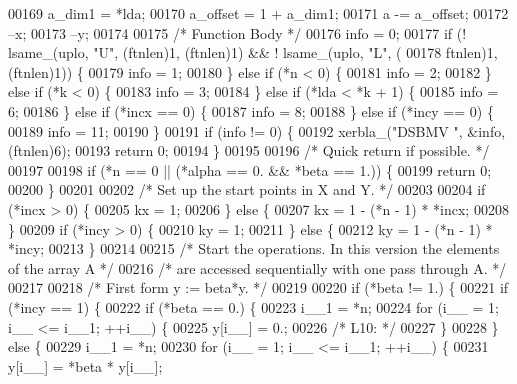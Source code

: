 \begin{DoxyCode}
00169     a\_dim1 = *lda;
00170     a\_offset = 1 + a\_dim1;
00171     a -= a\_offset;
00172     --x;
00173     --y;
00174 
00175     \textcolor{comment}{/* Function Body */}
00176     info = 0;
00177     \textcolor{keywordflow}{if} (! lsame\_(uplo, \textcolor{stringliteral}{"U"}, (ftnlen)1, (ftnlen)1) && ! lsame\_(uplo, \textcolor{stringliteral}{"L"}, (
00178         ftnlen)1, (ftnlen)1)) \{
00179     info = 1;
00180     \} \textcolor{keywordflow}{else} \textcolor{keywordflow}{if} (*n < 0) \{
00181     info = 2;
00182     \} \textcolor{keywordflow}{else} \textcolor{keywordflow}{if} (*k < 0) \{
00183     info = 3;
00184     \} \textcolor{keywordflow}{else} \textcolor{keywordflow}{if} (*lda < *k + 1) \{
00185     info = 6;
00186     \} \textcolor{keywordflow}{else} \textcolor{keywordflow}{if} (*incx == 0) \{
00187     info = 8;
00188     \} \textcolor{keywordflow}{else} \textcolor{keywordflow}{if} (*incy == 0) \{
00189     info = 11;
00190     \}
00191     \textcolor{keywordflow}{if} (info != 0) \{
00192     xerbla\_(\textcolor{stringliteral}{"DSBMV "}, &info, (ftnlen)6);
00193     \textcolor{keywordflow}{return} 0;
00194     \}
00195 
00196 \textcolor{comment}{/*     Quick return if possible. */}
00197 
00198     \textcolor{keywordflow}{if} (*n == 0 || (*alpha == 0. && *beta == 1.)) \{
00199     \textcolor{keywordflow}{return} 0;
00200     \}
00201 
00202 \textcolor{comment}{/*     Set up the start points in  X  and  Y. */}
00203 
00204     \textcolor{keywordflow}{if} (*incx > 0) \{
00205     kx = 1;
00206     \} \textcolor{keywordflow}{else} \{
00207     kx = 1 - (*n - 1) * *incx;
00208     \}
00209     \textcolor{keywordflow}{if} (*incy > 0) \{
00210     ky = 1;
00211     \} \textcolor{keywordflow}{else} \{
00212     ky = 1 - (*n - 1) * *incy;
00213     \}
00214 
00215 \textcolor{comment}{/*     Start the operations. In this version the elements of the array A */}
00216 \textcolor{comment}{/*     are accessed sequentially with one pass through A. */}
00217 
00218 \textcolor{comment}{/*     First form  y := beta*y. */}
00219 
00220     \textcolor{keywordflow}{if} (*beta != 1.) \{
00221     \textcolor{keywordflow}{if} (*incy == 1) \{
00222         \textcolor{keywordflow}{if} (*beta == 0.) \{
00223         i\_\_1 = *n;
00224         \textcolor{keywordflow}{for} (i\_\_ = 1; i\_\_ <= i\_\_1; ++i\_\_) \{
00225             y[i\_\_] = 0.;
00226 \textcolor{comment}{/* L10: */}
00227         \}
00228         \} \textcolor{keywordflow}{else} \{
00229         i\_\_1 = *n;
00230         \textcolor{keywordflow}{for} (i\_\_ = 1; i\_\_ <= i\_\_1; ++i\_\_) \{
00231             y[i\_\_] = *beta * y[i\_\_];

\end{DoxyCode}

